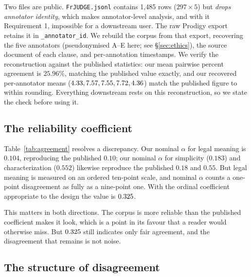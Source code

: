 \documentclass[11pt]{article}
\begin{document}
Two files are public. \texttt{FrJUDGE.jsonl} contains 1{,}485 rows
($297\times5$) but \emph{drops annotator identity}, which makes annotator-level
analysis, and with it Requirement 1, impossible for a downstream user.
The raw Prodigy export retains it in \texttt{\_annotator\_id}. We rebuild the
corpus from that export, recovering the five annotators (pseudonymised A--E
here; see \S\ref{sec:ethics}), the source document of each clause, and
per-annotation timestamps. We verify the reconstruction against the published
statistics: our mean pairwise percent agreement is $25.96\%$, matching the
published value exactly, and our recovered per-annotator means ($4.33, 7.57, 7.55, 7.72, 4.36$)
match the published figure to within rounding. Everything downstream rests on
this reconstruction, so we state the check before using it.

\subsection{The reliability coefficient}
\label{sec:agreement}

Table~\ref{tab:agreement} resolves a discrepancy. Our nominal $\alpha$ for legal
meaning is $0.104$, reproducing the published $0.10$; our nominal $\alpha$ for
simplicity ($0.183$) and characterization ($0.552$) likewise reproduce the
published $0.18$ and $0.55$. But legal meaning is measured on an ordered
ten-point scale, and nominal $\alpha$ counts a one-point disagreement as fully
as a nine-point one. With the ordinal coefficient appropriate to the design
\citep{krippendorff2004content,artstein2008inter} the value is $0.325$.

This matters in both directions. The corpus is more reliable than the published
coefficient makes it look, which is a point in its favour that a reader would
otherwise miss. But $0.325$ still indicates only fair agreement, and the
disagreement that remains is not noise.

\begin{table}[t]\centering\small

\caption{Krippendorff's $\alpha$ on \textsc{FrJudge}. Legal meaning is an
ordinal ten-point scale; the published $0.10$ is the nominal coefficient, which
is not the appropriate measure for this design.}
\label{tab:agreement}
\end{table}

\subsection{The structure of disagreement}
\end{document}
